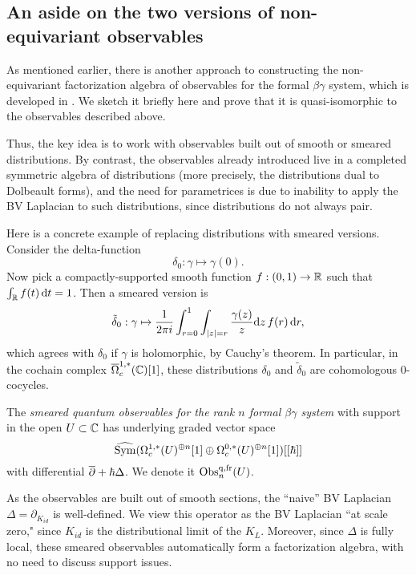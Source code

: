 \subsection{An aside on the two versions of non-equivariant observables}
\label{noneqsec}

As mentioned earlier, there is another approach to constructing the non-equivariant factorization algebra of observables
for the formal $\beta\gamma$ system, which is developed in \cite{CG1}.
We sketch it briefly here and prove that it is quasi-isomorphic to the observables described above.

Thus, the key idea is to work with observables built out of smooth or smeared distributions.
By contrast, the observables already introduced live in a completed symmetric algebra of distributions 
(more precisely, the distributions dual to Dolbeault forms),
and the need for parametrices is due to inability to apply the BV Laplacian to such distributions,
since distributions do not always pair.

Here is a concrete example of replacing distributions with smeared versions.
Consider the delta-function 
\[
\delta_0: \gamma \mapsto \gamma(0).
\]
Now pick a compactly-supported smooth function $f: (0,1) \to \mathbb R$ such that $\int_\mathbb R f(t) \, {\rm d} t = 1$.
Then a smeared version is
\[
\tilde{\delta}_0: \gamma \mapsto \frac{1}{2\pi i}\int_{r = 0}^1 \int_{|z|=r} \frac{\gamma(z)}{z} {\rm d} z\, f(r) \,{\rm d} r,
\]
which agrees with $\delta_0$ if $\gamma$ is holomorphic, by Cauchy's theorem.
In particular, in the cochain complex $\overline{\Omega}^{1,*}_c(\mathbb C)[1]$, 
these distributions $\delta_0$ and $\tilde{\delta}_0$ are cohomologous $0$-cocycles.

\def\fr{{\rm fr}}

\begin{dfn}
The \emph{smeared quantum observables for the rank $n$ formal $\beta\gamma$ system} 
with support in the open $U \subset \mathbb C$ has underlying graded vector space
\[
\widehat{{\rm Sym}}({\Omega}^{1,*}_c(U)^{\oplus n}[1] \oplus {\Omega}^{0,*}_c(U)^{\oplus n}[1])[[\hbar]]
\]
with differential $\overline{\partial} + \hbar \Delta$. 
We denote it $\Obs^{\q,\fr}_n(U)$.
\end{dfn}

As the observables are built out of smooth sections, the ``naive'' BV Laplacian $\Delta = \partial_{K_{id}}$ is well-defined.
We view this operator as the BV Laplacian ``at scale zero," since $K_{id}$ is the distributional limit of the $K_L$.
Moreover, since $\Delta$ is fully local, these smeared observables automatically form a factorization algebra,
with no need to discuss support issues.

